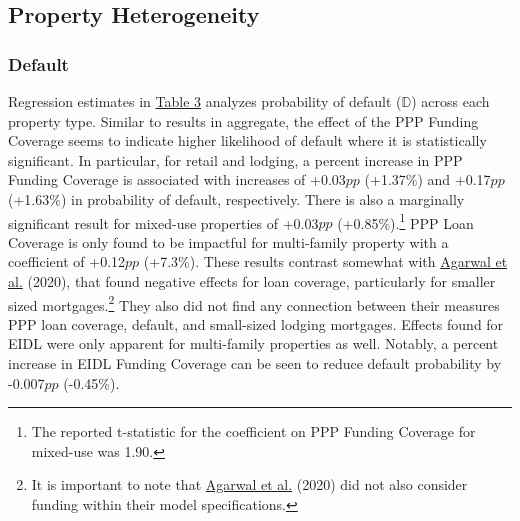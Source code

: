 \documentclass[11pt]{article} %
\begin{document}
\subsection{Property Heterogeneity}

\subsubsection{Default}
Regression estimates in \hyperlink{Regression 2}{Table 3} analyzes probability of default ($\mathbb{D}$) across each property type. Similar to results in aggregate, the effect of the PPP Funding Coverage seems to indicate higher likelihood of default where it is statistically significant. In particular, for retail and lodging, a percent increase in PPP Funding Coverage is associated with increases of +0.03\hspace{0.20em}$pp$ (+1.37\%) and +0.17\hspace{0.20em}$pp$ (+1.63\%) in probability of default, respectively. There is also a marginally significant result for mixed-use properties of +0.03\hspace{0.20em}$pp$ (+0.85\%).\footnote{The reported t-statistic for the coefficient on PPP Funding Coverage for mixed-use was 1.90.} PPP Loan Coverage is only found to be impactful for multi-family property with a coefficient of +0.12\hspace{0.20em}$pp$ (+7.3\%). These results contrast somewhat with \hyperlink{Agarwal}{Agarwal et al.} (2020), that found negative effects for loan coverage, particularly for smaller sized mortgages.\footnote{It is important to note that \hyperlink{Agarwal}{Agarwal et al.} (2020) did not also consider funding within their model specifications.} They also did not find any connection between their measures PPP loan coverage, default, and small-sized lodging mortgages. Effects found for EIDL were only apparent for multi-family properties as well. Notably, a percent increase in EIDL Funding Coverage can be seen to reduce default probability by -0.007\hspace{0.20em}$pp$ (-0.45\%). 
\end{document}
